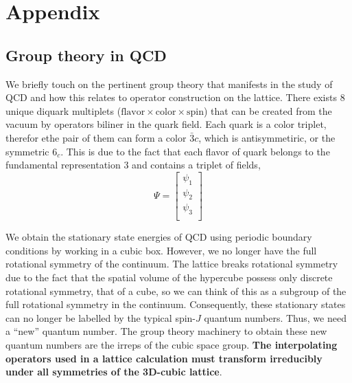 \chapter{Appendix}\label{sec:app}
\section{Group theory in QCD}
We briefly touch on the pertinent group theory that manifests in the study of QCD and how this relates to operator construction on the lattice. 
There exists 8 unique diquark multiplets ($\text{flavor} \times \text{color} \times \text{spin}$) that can be created from the vacuum by operators biliner in the quark field. Each quark is a color triplet, therefor ethe pair of them can form a color $\bar{3}c$, which is antisymmetiric, or the symmetric $6_c$. This is due to the fact that each flavor of quark belongs to the fundamental representation $3$ and contains a triplet of fields, 
\begin{equation}
    \Psi = \begin{bmatrix}
        \psi_1 \\
        \psi_2 \\
        \psi_3 \\ 
    \end{bmatrix}
\end{equation}

We obtain the stationary state energies of QCD using periodic boundary conditions by working in a cubic box. However, we no longer have the full rotational symmetry of the continuum. The lattice breaks rotational symmetry due to the fact that the spatial volume of the hypercube possess only discrete rotational symmetry, that of a cube, so we can think of this as a subgroup of the full rotational symmetry in the continuum. Consequently, these stationary states can no longer be labelled by the typical spin-$J$ quantum numbers. Thus, we need a ``new'' quantum number. The group theory machinery to obtain these new quantum numbers are the irreps of the cubic space group. \textbf{The interpolating operators used in a lattice calculation must transform irreducibly under all symmetries of the 3D-cubic lattice}. 

